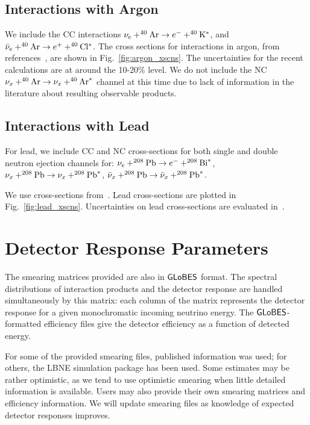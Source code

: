 \documentclass[12pt]{article}
\newcommand{\globes}{\sf{GLoBES}}
\begin{document}
\subsection{Interactions with Argon}

We include the CC interactions
$\nu_e + ^{40}{\rm Ar} \rightarrow e^- + ^{40}{\rm K^*}$, and
$\bar{\nu}_e + ^{40}{\rm Ar} \rightarrow e^+ + ^{40}{\rm Cl^*}$.
The cross sections for interactions in argon, from references~\cite{GilBotella:2004bv,Kolbe:2003ys},
are shown in Fig.~\ref{fig:argon_xscns}.   The uncertainties for the recent calculations 
are at around the 10-20\% level.
We do not include the NC
$\nu_x + ^{40}{\rm Ar} \rightarrow \nu_x+ ^{40}{\rm Ar}^*$ channel at this time
due to lack of information in the literature about resulting observable products.


\subsection{Interactions with Lead}

For lead, we include 
CC and NC cross-sections for both single and double
neutron ejection channels for:
$\nu_e + ^{208}{\rm Pb} \rightarrow e^- + ^{208}{\rm Bi}^{*}$, 
$\nu_x + ^{208}{\rm Pb} \rightarrow \nu_x + ^{208}{\rm Pb}^{*}$, 
$\bar{\nu}_x + ^{208}{\rm Pb} \rightarrow \bar{\nu}_x + ^{208}{\rm Pb}^{*}$.

We use cross-sections from~\cite{Engel:2002hg}.
Lead cross-sections are plotted in Fig.~\ref{fig:lead_xscns}.  Uncertainties on lead cross-sections are evaluated in~\cite{Paar:2011pz}.

\section{Detector Response Parameters}\label{response}

The smearing matrices provided are also in $\globes$ format.  The
spectral distributions of interaction products and the detector
response are handled simultaneously by this matrix: each column of the
matrix represents the detector response for a given monochromatic
incoming neutrino energy.  The $\globes$-formatted efficiency files give the
detector efficiency as a function of detected energy. 

For some of the provided smearing files, published information was
used; for others, the LBNE simulation package has been used.  Some
estimates may be rather optimistic, as we tend to use optimistic
smearing when little detailed information is available.  Users may
also provide their own smearing matrices and efficiency information.
We will update smearing files as knowledge of
expected detector responses improves.
\end{document}
